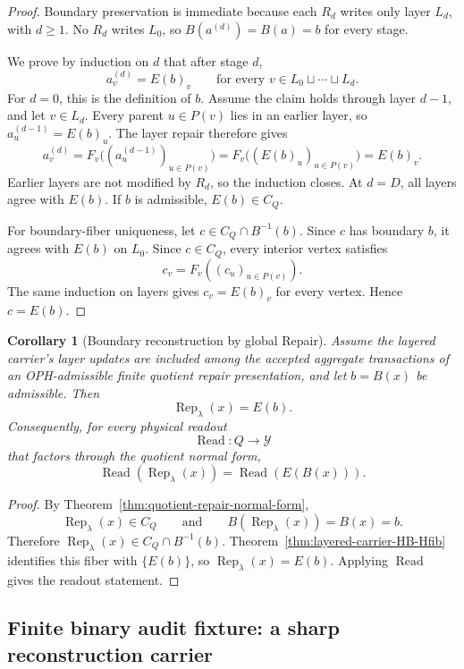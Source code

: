 \documentclass[11pt]{article}
\newtheorem{corollary}[theorem]{Corollary}
\theoremstyle{remark}
\theoremstyle{plain}
\begin{document}
\begin{proof}
Boundary preservation is immediate because each \(R_d\) writes only layer \(L_d\), with \(d\ge1\).
No \(R_d\) writes \(L_0\), so \(B(a^{(d)})=B(a)=b\) for every stage.

We prove by induction on \(d\) that after stage \(d\),
\[
a^{(d)}_v=E(b)_v
\qquad
\text{for every }v\in L_0\sqcup\cdots\sqcup L_d.
\]
For \(d=0\), this is the definition of \(b\).  Assume the claim holds through layer \(d-1\), and
let \(v\in L_d\).  Every parent \(u\in P(v)\) lies in an earlier layer, so
\(a^{(d-1)}_u=E(b)_u\).  The layer repair therefore gives
\[
a^{(d)}_v
=
F_v\bigl((a^{(d-1)}_u)_{u\in P(v)}\bigr)
=
F_v\bigl((E(b)_u)_{u\in P(v)}\bigr)
=
E(b)_v.
\]
Earlier layers are not modified by \(R_d\), so the induction closes.  At \(d=D\), all layers agree
with \(E(b)\).  If \(b\) is admissible, \(E(b)\in C_Q\).

For boundary-fiber uniqueness, let \(c\in C_Q\cap B^{-1}(b)\).  Since \(c\) has boundary \(b\), it
agrees with \(E(b)\) on \(L_0\).  Since \(c\in C_Q\), every interior vertex satisfies
\[
c_v=F_v((c_u)_{u\in P(v)}).
\]
The same induction on layers gives \(c_v=E(b)_v\) for every vertex.  Hence \(c=E(b)\).
\end{proof}

\begin{corollary}[Boundary reconstruction by global Repair]\label{cor:layered-carrier-reconstruction}
Assume the layered carrier's layer updates are included among the accepted aggregate transactions
of an OPH-admissible finite quotient repair presentation, and let \(b=B(x)\) be admissible.  Then
\[
\operatorname{Rep}_\lambda(x)=E(b).
\]
Consequently, for every physical readout
\[
\operatorname{Read}:Q\to\mathcal Y
\]
that factors through the quotient normal form,
\[
\operatorname{Read}(\operatorname{Rep}_\lambda(x))
=
\operatorname{Read}(E(B(x))).
\]
\end{corollary}

\begin{proof}
By Theorem~\ref{thm:quotient-repair-normal-form},
\[
\operatorname{Rep}_\lambda(x)\in C_Q
\qquad\text{and}\qquad
B(\operatorname{Rep}_\lambda(x))=B(x)=b.
\]
Therefore \(\operatorname{Rep}_\lambda(x)\in C_Q\cap B^{-1}(b)\).  Theorem~\ref{thm:layered-carrier-HB-Hfib}
identifies this fiber with \(\{E(b)\}\), so \(\operatorname{Rep}_\lambda(x)=E(b)\).  Applying
\(\operatorname{Read}\) gives the readout statement.
\end{proof}

\subsection{Finite binary audit fixture: a sharp reconstruction carrier}
\label{subsec:finite-binary-audit-fixture}
\end{document}

